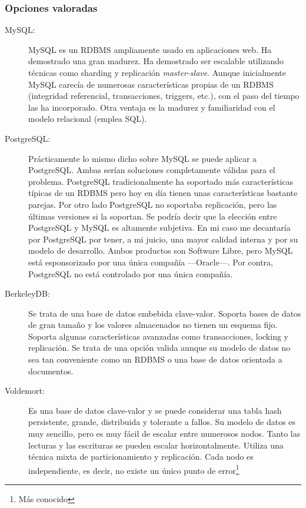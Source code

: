 \subsubsection{Opciones valoradas}
\begin{description}

\item[MySQL:] MySQL es un RDBMS ampliamente usado en aplicaciones
  web. Ha demostrado una gran madurez. Ha demostrado ser escalable
  utilizando técnicas como sharding\cite{SHARDING} y replicación
  \emph{master-slave}\cite{MASTER-SLAVE}. Aunque inicialmente MySQL
  carecía de numerosas características propias de un RDBMS (integridad
  referencial, transacciones, triggers, etc.), con el paso del tiempo
  las ha incorporado. Otra ventaja es la madurez y familiaridad con el
  modelo relacional (emplea SQL).
\item[PostgreSQL:] Prácticamente lo mismo dicho sobre MySQL se puede
  aplicar a PostgreSQL. Ambas serían soluciones completamente válidas
  para el problema. PostgreSQL tradicionalmente ha soportado más
  características típicas de un RDBMS pero hoy en día tienen unas
  características bastante parejas. Por otro lado PostgreSQL no
  soportaba replicación, pero las últimas versiones si la soportan. Se
  podría decir que la elección entre PostgreSQL y MySQL es altamente
  subjetiva. En mi caso me decantaría por PostgreSQL por tener, a mi
  juicio, una mayor calidad interna y por su modelo de
  desarrollo. Ambos productos son Software Libre, pero MySQL está
  esponsorizado por una única compañía ---Oracle---. Por contra,
  PostgreSQL no está controlado por una única compañía.
\item[BerkeleyDB:] Se trata de una base de datos embebida
  clave-valor. Soporta bases de datos de gran tamaño y los valores
  almacenados no tienen un esquema fijo. Soporta algunas
  características avanzadas como transacciones, locking y
  replicación. Se trata de una opción valida aunque su modelo de datos
  no sea tan conveniente como un RDBMS o una base de datos orientada a
  documentos.
\item[Voldemort:] Es una base de datos clave-valor y se puede
  considerar una tabla hash persistente, grande, distribuida y
  tolerante a fallos. Su modelo de datos es muy sencillo, pero es muy
  fácil de escalar entre numerosos nodos. Tanto las lecturas y las
  escrituras se pueden escalar horizontalmente. Utiliza una técnica
  mixta de particionamiento y replicación. Cada nodo es independiente,
  es decir, no existe un único punto de error\footnote{Más conocido
}
\end{description}
